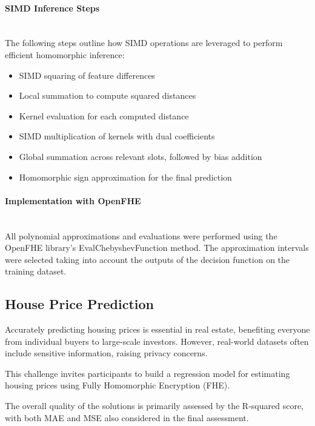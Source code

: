 \documentclass[article]{iacrtrans}
\begin{document}
\paragraph{SIMD Inference Steps}\mbox{}\\

The following steps outline how SIMD operations are leveraged to perform efficient homomorphic inference:
\begin{itemize}
    \item SIMD squaring of feature differences
    \item Local summation to compute squared distances
    \item Kernel evaluation for each computed distance
    \item SIMD multiplication of kernels with dual coefficients
    \item Global summation across relevant slots, followed by bias addition
    \item Homomorphic sign approximation for the final prediction
\end{itemize}

\paragraph{Implementation with OpenFHE}\mbox{}\\

All polynomial approximations and evaluations were performed using the OpenFHE library’s EvalChebyshevFunction method. The approximation intervals were selected taking into account the outputs of the decision function on the training dataset.

\subsection{House Price Prediction}

Accurately predicting housing prices is essential in real estate, benefiting everyone from individual buyers to large-scale investors. However, real-world datasets often include sensitive information, raising privacy concerns.

This challenge invites participants to build a regression model for estimating housing prices using Fully Homomorphic Encryption (FHE). 

The overall quality of the solutions is primarily assessed by the R-squared score, with both MAE and MSE also considered in the final assessment.  
\end{document}
